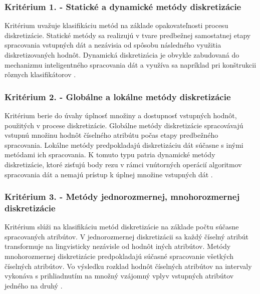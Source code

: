  
\subsubsection*{Kritérium 1. - Statické a dynamické metódy diskretizácie}
Kritérium uvažuje klasifikáciu metód na základe opakovateľnosti procesu diskretizácie. Statické metódy sa realizujú v tvare predbežnej samostatnej etapy spracovania vstupných dát a nezávisia od spôsobu následného využitia diskretizovaných hodnôt. Dynamická diskretizácia je obvykle zabudovaná do mechanizmu inteligentného spracovania dát a využíva sa napríklad pri konštrukcii rôznych klasifikátorov \cite{levashenkoProj}.



\subsubsection*{Kritérium 2. - Globálne a lokálne metódy diskretizácie}
Kritérium berie do úvahy úplnosť množiny a dostupnosť vstupných hodnôt, použitých v procese diskretizácie. Globálne metódy diskretizácie spracovávajú vstupnú množinu hodnôt číselného atribútu počas etapy predbežného spracovania. Lokálne metódy predpokladajú diskretizáciu dát súčasne s inými metódami ich spracovania. K tomuto typu patria dynamické metódy diskretizácie, ktoré zisťujú body rezu v rámci vnútorných operácií algoritmov spracovania dát a nemajú prístup k úplnej množine vstupných dát \cite{levashenkoProj}.


\subsubsection*{Kritérium 3. - Metódy jednorozmernej, mnohorozmernej diskretizácie }
Kritérium slúži na klasifikáciu metód diskretizácie na základe počtu súčasne spracovaných atribútov. V jednorozmernej diskretizácii sa každý číselný atribút transformuje na lingvisticky nezávisle od hodnôt iných atribútov. Metódy mnohorozmernej diskretizácie predpokladajú súčasné spracovanie všetkých číselných atribútov. 
Vo výsledku rozklad hodnôt číselných atribútov na intervaly vykonáva s prihliadnutím na množný vzájomný vplyv vstupných atribútov jedného na druhý \cite{levashenkoProj}.


